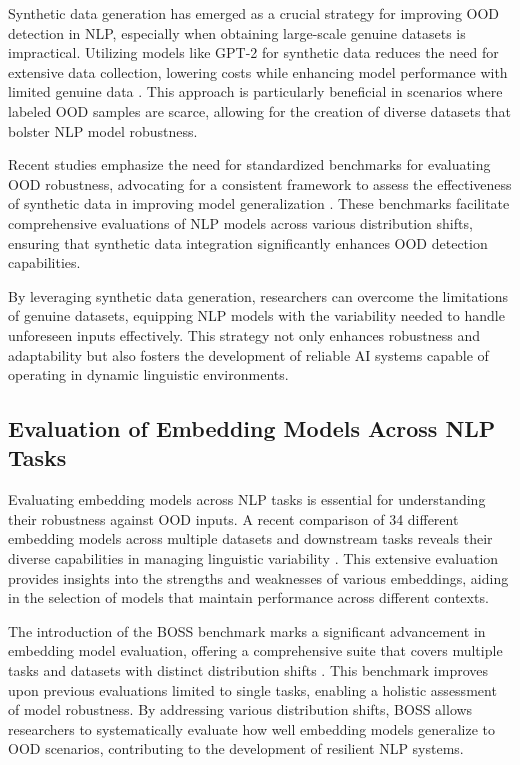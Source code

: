 Synthetic data generation has emerged as a crucial strategy for improving OOD detection in NLP, especially when obtaining large-scale genuine datasets is impractical. Utilizing models like GPT-2 for synthetic data reduces the need for extensive data collection, lowering costs while enhancing model performance with limited genuine data \cite{whitfield2021usinggpt2createsynthetic}. This approach is particularly beneficial in scenarios where labeled OOD samples are scarce, allowing for the creation of diverse datasets that bolster NLP model robustness.

Recent studies emphasize the need for standardized benchmarks for evaluating OOD robustness, advocating for a consistent framework to assess the effectiveness of synthetic data in improving model generalization \cite{yuan2023revisiting}. These benchmarks facilitate comprehensive evaluations of NLP models across various distribution shifts, ensuring that synthetic data integration significantly enhances OOD detection capabilities.

By leveraging synthetic data generation, researchers can overcome the limitations of genuine datasets, equipping NLP models with the variability needed to handle unforeseen inputs effectively. This strategy not only enhances robustness and adaptability but also fosters the development of reliable AI systems capable of operating in dynamic linguistic environments.

\subsection{Evaluation of Embedding Models Across NLP Tasks} \label{subsec:Evaluation of Embedding Models Across NLP Tasks}

Evaluating embedding models across NLP tasks is essential for understanding their robustness against OOD inputs. A recent comparison of 34 different embedding models across multiple datasets and downstream tasks reveals their diverse capabilities in managing linguistic variability \cite{darrin2024embeddingmodelpromisinganother}. This extensive evaluation provides insights into the strengths and weaknesses of various embeddings, aiding in the selection of models that maintain performance across different contexts.

The introduction of the BOSS benchmark marks a significant advancement in embedding model evaluation, offering a comprehensive suite that covers multiple tasks and datasets with distinct distribution shifts \cite{yuan2023revisiting}. This benchmark improves upon previous evaluations limited to single tasks, enabling a holistic assessment of model robustness. By addressing various distribution shifts, BOSS allows researchers to systematically evaluate how well embedding models generalize to OOD scenarios, contributing to the development of resilient NLP systems.

